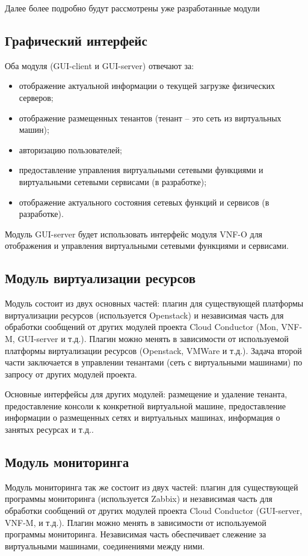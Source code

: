 \documentclass[oneside,final,14pt,a4paper]{extreport}
\begin{document}
Далее более подробно будут рассмотрены уже разработанные модули

\subsection{Графический интерфейс}
Оба модуля (GUI-client и GUI-server) отвечают за:
\begin{itemize}
	\item отображение актуальной информации о текущей загрузке физических серверов;
	\item отображение размещенных тенантов (тенант -- это сеть из виртуальных машин);
	\item авторизацию пользователей;
	\item предоставление управления виртуальными сетевыми функциями и виртуальными сетевыми сервисами (в разработке);
	\item отображение актуального состояния сетевых функций и сервисов (в разработке).
\end{itemize}

Модуль GUI-server будет использовать интерфейс модуля VNF-O для отображения и управления виртуальными сетевыми функциями и сервисами.

\subsection{Модуль виртуализации ресурсов}
Модуль состоит из двух основных частей: плагин для существующей платформы виртуализации ресурсов (используется Openstack) и независимая часть для обработки сообщений от других модулей проекта Cloud Conductor (Mon, VNF-M, GUI-server и т.д.). Плагин можно менять в зависимости от используемой платформы виртуализации ресурсов (Openstack, VMWare и т.д.). Задача второй части заключается в управлении тенантами (сеть с виртуальными машинами) по запросу от других модулей проекта. 

Основные интерфейсы для других модулей: размещение и удаление тенанта, предоставление консоли к конкретной виртуальной машине, предоставление информации о размещенных сетях и виртуальных машинах, информация о занятых ресурсах и т.д..

\subsection{Модуль мониторинга}
Модуль мониторинга так же состоит из двух частей: плагин для существующей программы мониторинга (используется Zabbix) и независимая часть для обработки сообщений от других модулей проекта Cloud Conductor (GUI-server, VNF-M, и т.д.). Плагин можно менять в зависимости от используемой программы мониторинга. Независимая часть обеспечивает слежение за виртуальными машинами, соединениями между ними.
\end{document}
